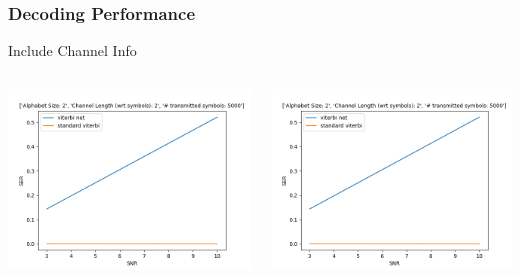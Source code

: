 \documentclass[10pt,tgadventor, onlymath]{beamer}
\begin{document}
\begin{frame}
\frametitle{Decoding Performance}
Include Channel Info
\begin{columns}
\begin{column}{0.5\linewidth}
	\includegraphics[width=\textwidth]{decoding}
\end{column}
\begin{column}{0.5\linewidth}
	\includegraphics[width=\textwidth]{decoding}
\end{column}
\end{columns}
\end{frame}
\end{document}
